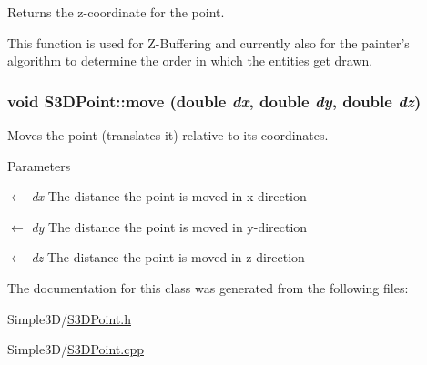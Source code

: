 Returns the z-\/coordinate for the point. 

This function is used for Z-\/Buffering and currently also for the painter's algorithm to determine the order in which the entities get drawn. \hypertarget{class_s3_d_point_a18bbc742cbadc8d49d0600c3f80caf91}{
\subsubsection[{move}]{\setlength{\rightskip}{0pt plus 5cm}void S3DPoint::move (double {\em dx}, \/  double {\em dy}, \/  double {\em dz})}}
\label{class_s3_d_point_a18bbc742cbadc8d49d0600c3f80caf91}


Moves the point (translates it) relative to its coordinates. 


\begin{DoxyParams}{Parameters}
\item[\mbox{$\leftarrow$} {\em dx}]The distance the point is moved in x-\/direction \item[\mbox{$\leftarrow$} {\em dy}]The distance the point is moved in y-\/direction \item[\mbox{$\leftarrow$} {\em dz}]The distance the point is moved in z-\/direction \end{DoxyParams}


The documentation for this class was generated from the following files:\begin{DoxyCompactItemize}
\item 
Simple3D/\hyperlink{_s3_d_point_8h}{S3DPoint.h}\item 
Simple3D/\hyperlink{_s3_d_point_8cpp}{S3DPoint.cpp}\end{DoxyCompactItemize}
